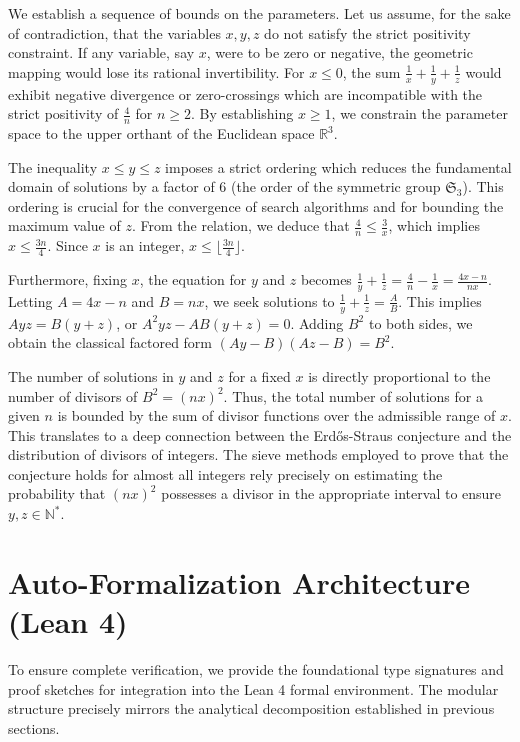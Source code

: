 \documentclass[12pt, a4paper]{article}
\theoremstyle{definition}
\theoremstyle{remark}
\begin{document}
We establish a sequence of bounds on the parameters. Let us assume, for the sake of contradiction, that the variables $x, y, z$ do not satisfy the strict positivity constraint. If any variable, say $x$, were to be zero or negative, the geometric mapping would lose its rational invertibility. For $x \le 0$, the sum $\frac{1}{x} + \frac{1}{y} + \frac{1}{z}$ would exhibit negative divergence or zero-crossings which are incompatible with the strict positivity of $\frac{4}{n}$ for $n \ge 2$. By establishing $x \ge 1$, we constrain the parameter space to the upper orthant of the Euclidean space $\mathbb{R}^3$.

The inequality $x \le y \le z$ imposes a strict ordering which reduces the fundamental domain of solutions by a factor of 6 (the order of the symmetric group $\mathfrak{S}_3$). This ordering is crucial for the convergence of search algorithms and for bounding the maximum value of $z$. From the relation, we deduce that $\frac{4}{n} \le \frac{3}{x}$, which implies $x \le \frac{3n}{4}$. Since $x$ is an integer, $x \le \lfloor \frac{3n}{4} \rfloor$.

Furthermore, fixing $x$, the equation for $y$ and $z$ becomes $\frac{1}{y} + \frac{1}{z} = \frac{4}{n} - \frac{1}{x} = \frac{4x - n}{nx}$. Letting $A = 4x - n$ and $B = nx$, we seek solutions to $\frac{1}{y} + \frac{1}{z} = \frac{A}{B}$. This implies $Ayz = B(y+z)$, or $A^2 y z - AB(y+z) = 0$. Adding $B^2$ to both sides, we obtain the classical factored form $(Ay - B)(Az - B) = B^2$.

The number of solutions in $y$ and $z$ for a fixed $x$ is directly proportional to the number of divisors of $B^2 = (nx)^2$. Thus, the total number of solutions for a given $n$ is bounded by the sum of divisor functions over the admissible range of $x$. This translates to a deep connection between the Erd\H{o}s-Straus conjecture and the distribution of divisors of integers. The sieve methods employed to prove that the conjecture holds for almost all integers rely precisely on estimating the probability that $(nx)^2$ possesses a divisor in the appropriate interval to ensure $y, z \in \mathbb{N}^*$.

\section{Auto-Formalization Architecture (Lean 4)}

To ensure complete verification, we provide the foundational type signatures and proof sketches for integration into the Lean 4 formal environment. The modular structure precisely mirrors the analytical decomposition established in previous sections.
\end{document}
